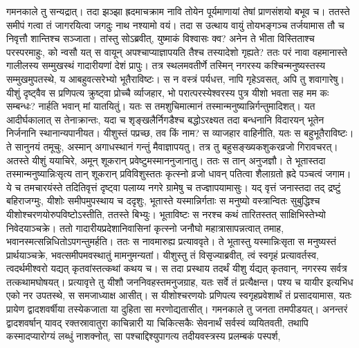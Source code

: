 \vakya गमनकाले तु सन्यद्रात्। तदा झञ्झा ह्रदमाचक्राम नावि तोयेन पूर्यमाणायां तेषां प्राणसंशयो बभूव च।
\vakya ततस्ते समीपं गत्वा तं जागरयित्वा जगदुः नाथ नश्यामो वयं। तदा स उत्थाय वायुं तोयभङ्गञ्च तर्जयामास तौ च निवृत्तौ शान्तिश्च सञ्जाता।
\vakya तांस्तु सोऽब्रवीत्, युष्माकं विश्वासः क्व? अनेन ते भीता विस्तिताश्च परस्परमाहुः, को न्वसौ यत् स वायून् अपश्चाप्याज्ञापयति तैश्च तस्यादेशो गृह्यते?
\vakya ततः परं नावा वहमानास्ते गालीलस्य सम्मुखस्थं गादारीयणां देशं प्रापुः।
\vakya तत्र स्थलमवतीर्णे तस्मिन् नगरस्य कश्चिन्मनुष्यस्तस्य सम्मुखमुपतस्थे, य आबहुवत्सरेभ्यो भूतैराविष्टः। स न वस्त्रं पर्यधत्त, नापि गृहेऽवसत्, अपि तु शवागारेषु।
\vakya यीशुं दृष्ट्वैव स प्रणिपत्य क्रुष्ट्वा प्रोच्चै र्व्याजहार, भो परात्परस्येश्वरस्य पुत्र यीशो भवता सह मम कः सम्बन्धः? नार्हति भवान् मां यातयितुं।
\vakya यतः स तमशुचिमात्मानं तस्मान्मनुष्यान्निर्गन्तुमादिशत्। यत आदीर्घकालात् स तेनाक्रान्तः, यदा च शृङ्खलैर्निगडैश्च बद्धोऽरक्ष्यत तदा बन्धनानि विदारयन् भूतेन निर्जनानि स्थानान्यपानीयत।
\vakya यीशुस्तं पप्रच्छ, तव किं नाम? स व्याजहार वाहिनीति, यतः स बहुभूतैराविष्टः।
\vakya ते सानुनयं तमूचुः, अस्मान् अगाधस्थानं गन्तुं मैवाज्ञापयतु। तत्र तु बहुसङ्ख्यकशुकरव्रजो गिरावचरत्। अतस्ते यीशुं ययाचिरे, अमून् शूकरान् प्रवेष्टुमस्माननुजानातु।
\vakya ततः स तान् अनुजज्ञौ।
\vakya ते भूतास्तदा तस्मान्मनुष्यान्निःसृत्य तान् शूकरान् प्रविविशुस्ततः कृत्स्नो व्रजो धावन् पतित्वा शैलाग्रतो ह्रदे पञ्चत्वं जगाम।
\vakya ये च तमचारयंस्ते तदितिवृत्तं दृष्ट्वा पलाय्य नगरे ग्रामेषु च तज्ज्ञापयामासुः।
\vakya यद् वृत्तं जनास्तदा तद् द्रष्टुं बहिराजग्मुः, यीशोः समीपमुपस्थाय च ददृशुः, भूतास्ते यस्मान्निर्गताः स मनुष्यो वस्त्रान्वितः सुबुद्धिश्च यीशोश्चरणयोरुपविष्टोऽस्तीति, ततस्ते बिभ्युः।
\vakya भूताविष्टः स नरश्च कथं तारितस्तत् साक्षिभिस्तेभ्यो निवेदयाञ्चक्रे।
\vakya ततो गादारीयप्रदेशानिवासिनां कृत्स्नो जनौघो महात्रासापन्नत्वात् तमाह, भवानस्मत्सन्निधितोऽपगन्तुमर्हति।
\vakya ततः स नावमारुह्य प्रत्याववृते। ते भूतास्तु यस्मान्निःसृता स मनुष्यस्तं प्रार्थयाञ्चक्रे, भवत्समीपमवस्थातुं मामनुमन्यतां। यीशुस्तु तं विसृज्याब्रवीत्, त्वं स्वगृहं प्रत्यावर्तस्व, त्वदर्थमीश्वरो यद्यत् कृतवांस्तत्कथां कथय च।
\vakya स तदा प्रस्थाय तदर्थं यीशु र्यद्यत् कृतवान्, नगरस्य सर्वत्र तत्कथामघोषयत्।
\vakya प्रत्यावृत्ते तु यीशौ जननिवहस्तमनुजग्राह, यतः सर्वे तं प्रत्यैक्षन्त।
\vakya पश्य च यायीर इत्यभिध एको नर उपतस्थे, स समजाध्याक्ष आसीत्। स यीशोश्चरणयोः प्रणिपत्य स्वगृहप्रवेशार्थं तं प्रसादयामास,
\vakya यतः प्रायेण द्वादशवर्षीया तस्येकजाता या दुहिता सा मरणोद्यतासीत्।
\vakya गमनकाले तु जनता तमपीडयत्। अनन्तरं द्वादशवर्षान् यावद् रक्तस्रावातुरा काचिन्नारी या चिकित्सकैः सेवनार्थं सर्वस्वं व्ययितवती, तथापि कस्मादप्यारोग्यं लब्धुं नाशक्नोत्, सा पश्चाद्दिश्युपागत्य तदीयवस्त्रस्य प्रलम्बकं पस्पर्श,
